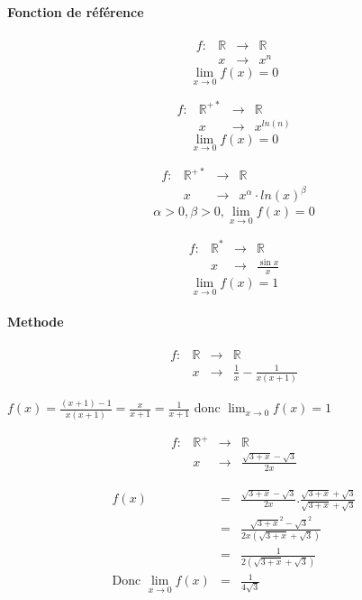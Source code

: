 \paragraph{Fonction de référence}
\[\begin{array}{rccl}
	f: &\mathbb{R} &\rightarrow &\mathbb{R} \\
	& x & \rightarrow &x^n 
\end{array}\]
\[\lim_{x \to 0} f(x) = 0\]


\[\begin{array}{rccl}
	f: &\mathbb{R}^{+*} &\rightarrow &\mathbb{R} \\
	   & x & \rightarrow &x^{ln(n)} 
\end{array}\]
\[\lim_{x \to 0} f(x) = 0\]

\[\begin{array}{rccl}
	f: &\mathbb{R}^{+*} &\rightarrow &\mathbb{R} \\
	   & x & \rightarrow &x^{\alpha} \cdot ln(x)^\beta
\end{array}\]
\[\alpha >0, \beta>0, \lim_{x \to 0} f(x) = 0\]

\[\begin{array}{rccl}
	f: &\mathbb{R}^* &\rightarrow &\mathbb{R} \\
	   & x & \rightarrow &\frac{\sin{x}}{x}
\end{array}\]
\[\lim_{x \to 0} f(x) = 1\]

\paragraph{Methode}
\[\begin{array}{rccl}
	f:&\mathbb{R} &\rightarrow &\mathbb{R}\\
	  &x& \rightarrow & \frac{1}{x} - \frac{1}{x(x+1)}
\end{array}\]

$f(x) = \frac{(x+1)-1}{x(x+1)} = \frac{x}{x+1} = \frac{1}{x+1}$
donc $\lim_{x \to 0}f(x) = 1$

\[\begin{array}{rccl}
	f:&\mathbb{R}^+ &\rightarrow &\mathbb{R}\\
	  &x& \rightarrow & \frac{\sqrt{3+x} - \sqrt{3}}{2x}
\end{array}\]

\[\begin{array}{rccl}
	f(x) &=& \frac{\sqrt{3+x} - \sqrt{3}}{2x} . \frac{\sqrt{3+x} + \sqrt{3}}{\sqrt{3+x} + \sqrt{3}} \\
			   &=& \frac{\sqrt{3+x}^2 - \sqrt{3}^2}{2x(\sqrt{3+x} + \sqrt{3})} \\
			   &=& \frac{1}{2(\sqrt{3+x}+\sqrt{3})} \\
		\text{Donc } \lim_{x \to 0} f(x) &=& \frac{1}{4\sqrt{3}}
\end{array}\]

